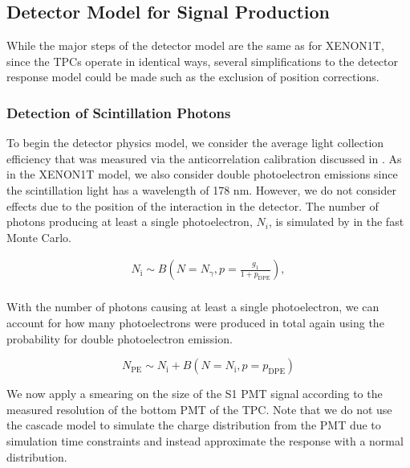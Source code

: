 \subsection{Detector Model for Signal Production}

While the major steps of the detector model are the same as for XENON1T, since the TPCs operate in identical ways, several simplifications to the detector response model could be made such as the exclusion of position corrections.  


\subsubsection{Detection of Scintillation Photons}


To begin the detector physics model, we consider the average light collection efficiency that was measured via the anticorrelation calibration discussed in .  As in the XENON1T model, we also consider double photoelectron emissions \cite{faham2015measurements} since the scintillation light has a wavelength of 178 nm.  However, we do not consider effects due to the position of the interaction in the detector.  The number of photons producing at least a single photoelectron, $N_i$, is simulated by  in the fast Monte Carlo.


\begin{equation}
        \label{eqn:nerix_binomial_lce}
        \begin{gathered}
                N_{\textrm{i}} \sim B \left( N = N_{\gamma}, p = \frac{g_1}{1 + p_{\textrm{DPE}}} \right), \\
        \end{gathered}
\end{equation}


With the number of photons causing at least a single photoelectron, we can account for how many photoelectrons were produced in total again using the probability for double photoelectron emission.


\begin{equation}
        N_{\textrm{PE}} \sim N_{\textrm{i}} + B(N=N_{\textrm{i}}, p=p_{\textrm{DPE}})
\end{equation}

We now apply a smearing on the size of the S1 PMT signal according to the measured resolution of the bottom PMT of the TPC.  Note that we do not use the cascade model to simulate the charge distribution from the PMT due to simulation time constraints and instead approximate the response with a normal distribution.

